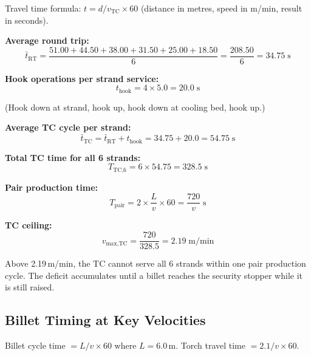 \documentclass[11pt,a4paper]{article}
\begin{document}
Travel time formula: $t = d / v_\text{TC} \times 60$ (distance in metres, speed in m/min, result in seconds).

\textbf{Average round trip:}
\begin{equation}
\bar{t}_\text{RT} = \frac{51.00 + 44.50 + 38.00 + 31.50 + 25.00 + 18.50}{6} = \frac{208.50}{6} = 34.75\;\text{s}
\end{equation}

\textbf{Hook operations per strand service:}
\begin{equation}
t_\text{hook} = 4 \times 5.0 = 20.0\;\text{s}
\end{equation}

(Hook down at strand, hook up, hook down at cooling bed, hook up.)

\textbf{Average TC cycle per strand:}
\begin{equation}
\bar{t}_\text{TC} = \bar{t}_\text{RT} + t_\text{hook} = 34.75 + 20.0 = 54.75\;\text{s}
\end{equation}

\textbf{Total TC time for all 6 strands:}
\begin{equation}
T_\text{TC,6} = 6 \times 54.75 = 328.5\;\text{s}
\end{equation}

\textbf{Pair production time:}
\begin{equation}
T_\text{pair} = 2 \times \frac{L}{v} \times 60 = \frac{720}{v}\;\text{s}
\end{equation}

\textbf{TC ceiling:}
\begin{equation}
\boxed{v_\text{max,TC} = \frac{720}{328.5} = 2.19\;\text{m/min}}
\end{equation}

Above 2.19\,m/min, the TC cannot serve all 6 strands within one pair production cycle. The deficit accumulates until a billet reaches the security stopper while it is still raised.

\subsection{Billet Timing at Key Velocities}

Billet cycle time $= L/v \times 60$ where $L = 6.0$\,m. Torch travel time $= 2.1/v \times 60$.
\end{document}
